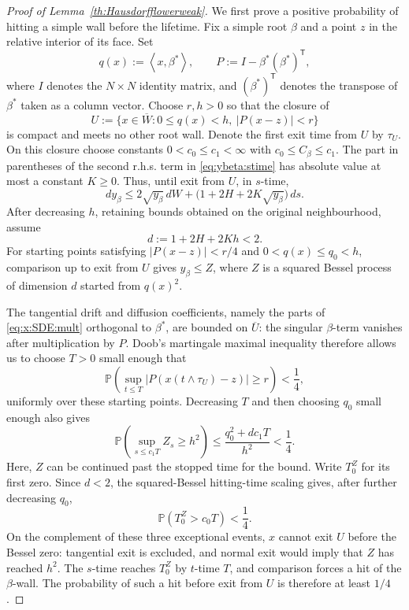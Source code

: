 \documentclass{article}
\numberwithin{equation}{section}
\newcommand{\pr}{\mathbb{P}}
\newcommand{\xbs}{\left<x,\beta^*\right>}
\theoremstyle{plain}
\begin{document}
\begin{proof}[Proof of Lemma~\ref{th:Hausdorfflowerweak}]
We first prove a positive probability of hitting a simple wall before the lifetime. Fix a simple root $\beta$ and a point $z$ in the relative interior of its face. Set
\[
 q(x):=\xbs,\qquad
 P:=I-\beta^*(\beta^*)^{\mathsf T},
\]
where $I$ denotes the $N\times N$ identity matrix, and $(\beta^*)^{\mathsf T}$ denotes the transpose of $\beta^*$ taken as a column vector. Choose $r,h>0$ so that the closure of
\[
 U:=\{x\in\overline W:0\leq q(x)<h,\ |P(x-z)|<r\}
\]
is compact and meets no other root wall. Denote the first exit time from $U$ by $\tau_U$. On this closure choose constants $0<c_0\leq c_1<\infty$ with $c_0\leq C_\beta\leq c_1$. The part in parentheses of the second r.h.s. term in \eqref{eq:ybeta:stime} has absolute value at most a constant $K\geq0$. Thus, until exit from $U$, in $s$-time,
\[
 dy_\beta\leq2\sqrt{y_\beta}\,dW+
 \bigl(1+2H+2K\sqrt{y_\beta}\bigr)\,ds.
\]
After decreasing $h$, retaining bounds obtained on the original neighbourhood, assume
\[
 d:=1+2H+2Kh<2.
\]
For starting points satisfying $|P(x-z)|<r/4$ and $0<q(x)\leq q_0<h$, comparison up to exit from $U$ gives $y_\beta\leq Z$, where $Z$ is a squared Bessel process of dimension $d$ started from $q(x)^2$.

The tangential drift and diffusion coefficients, namely the parts of \eqref{eq:x:SDE:mult} orthogonal to $\beta^*$, are bounded on $\overline U$: the singular $\beta$-term vanishes after multiplication by $P$. Doob's martingale maximal inequality therefore allows us to choose $T>0$ small enough that
\[
 \pr \left(\sup_{t\leq T}|P(x(t\wedge\tau_U)-z)|\geq r\right)<\frac14,
\]
uniformly over these starting points. Decreasing $T$ and then choosing $q_0$ small enough also gives
\[
 \pr\left(\sup_{s\leq c_1T}Z_s\geq h^2\right)
 \leq\frac{q_0^2+dc_1T}{h^2}<\frac14.
\]
Here, $Z$ can be continued past the stopped time for the bound. Write $T_0^Z$ for its first zero. Since $d<2$, the squared-Bessel hitting-time scaling gives, after further decreasing $q_0$,
\[
 \pr(T_0^Z>c_0T)<\frac14.
\]
On the complement of these three exceptional events, $x$ cannot exit $U$ before the Bessel zero: tangential exit is excluded, and normal exit would imply that $Z$ has reached $h^2$. The $s$-time reaches $T_0^Z$ by $t$-time $T$, and comparison forces a hit of the $\beta$-wall. The probability of such a hit before exit from $U$ is therefore at least $1/4$.


\end{proof}
\end{document}
